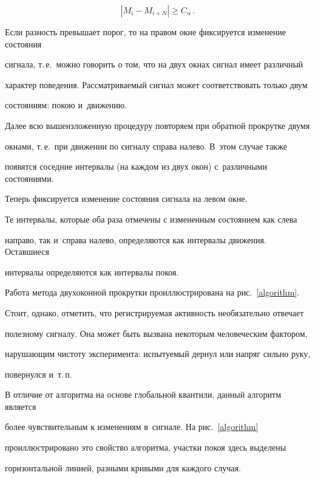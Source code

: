 \begin{equation*}

\left\vert M_i - M_{i+N}\right\vert \geqslant C_\alpha\,.

\end{equation*}

Если разность превышает порог, то на правом окне фиксируется изменение состояния 

сигнала, т.\,е.\ можно говорить о том, что на двух окнах сигнал имеет различный 

характер поведения. Рассматриваемый сигнал может соответствовать только двум 

состояниям: покою и~движению.



Далее всю вышеизложенную процедуру повторяем при обратной прокрутке двумя 

окнами, т.\,е.\ при движении по сигналу справа налево. В~этом случае также 

появятся соседние интервалы (на каждом из двух окон) с~различными состояниями. 

Теперь фиксируется изменение состояния сигнала на левом окне.



Те интервалы, которые оба раза отмечены с измененным состоянием как слева 

направо, так и~справа налево, определяются как интервалы движения. Оставшиеся 

интервалы определяются как интервалы покоя.



Работа метода двухоконной прокрутки проиллюстрирована на рис.~\ref{algorithm}.



Стоит, однако, отметить, что регистрируемая активность необязательно отвечает 

полезному сигналу. Она может быть вызвана некоторым человеческим фактором, 

нарушающим чистоту эксперимента: испытуемый дернул или напряг сильно руку, 

повернулся и~т.\,п.



В отличие от алгоритма на основе глобальной квантили, данный алгоритм является 

более чувствительным к изменениям в~сигнале. На рис.~\ref{algorithm} 

проиллюстрировано это свойство алгоритма, участки покоя здесь выделены 

горизонтальной линией, разными кривыми для каждого случая.



